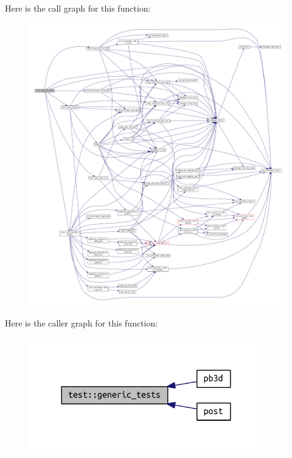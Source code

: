 Here is the call graph for this function\+:
\nopagebreak
\begin{figure}[H]
\begin{center}
\leavevmode
\includegraphics[width=350pt]{namespacetest_aca21ee464c0b1f4b617177afdde110ec_cgraph}
\end{center}
\end{figure}
Here is the caller graph for this function\+:
\nopagebreak
\begin{figure}[H]
\begin{center}
\leavevmode
\includegraphics[width=288pt]{namespacetest_aca21ee464c0b1f4b617177afdde110ec_icgraph}
\end{center}
\end{figure}
\mbox{\label{namespacetest_a0d4cb791bf762b2e52260fea7644a3ee}} 
